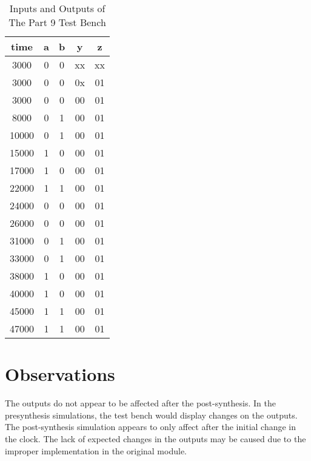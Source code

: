 \documentclass[paper=usletter, fontsize=12pt]{article}
\begin{document}
    \begin{table}[h]

        \caption{Inputs and Outputs of The Part 9 Test Bench}
        \centering
        \begin{tabular*}{200pt}{@{\extracolsep{\fill}} ccccc}

            \textbf{time} & \textbf{a} & \textbf{b} & \textbf{y} & \textbf{z} \\
            \hline
            3000 & 0 & 0 & xx & xx \\
            3000 & 0 & 0 & 0x & 01 \\
            3000 & 0 & 0 & 00 & 01 \\
            8000 & 0 & 1 & 00 & 01 \\
            10000 & 0 & 1 & 00 & 01 \\
            15000 & 1 & 0 & 00 & 01 \\
            17000 & 1 & 0 & 00 & 01 \\
            22000 & 1 & 1 & 00 & 01 \\
            24000 & 0 & 0 & 00 & 01 \\
            26000 & 0 & 0 & 00 & 01 \\
            31000 & 0 & 1 & 00 & 01 \\
            33000 & 0 & 1 & 00 & 01 \\
            38000 & 1 & 0 & 00 & 01 \\
            40000 & 1 & 0 & 00 & 01 \\
            45000 & 1 & 1 & 00 & 01 \\
            47000 & 1 & 1 & 00 & 01 \\

        \end{tabular*}
    \end{table}


    \section{Observations}
    The outputs do not appear to be affected after the post-synthesis. In the presynthesis simulations, the test bench would display changes on the outputs. The post-synthesis simulation appears to only affect after the initial change in the clock. The lack of expected changes in the outputs may be caused due to the improper implementation in the original module.
\end{document}
